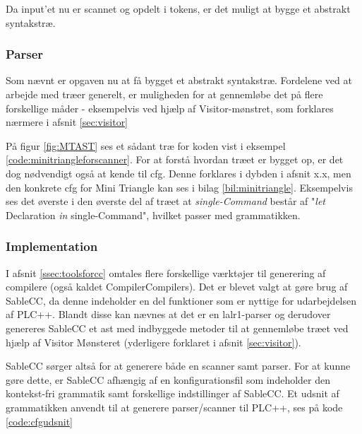 \noindent Da input'et nu er scannet og opdelt i tokens, er det muligt at bygge et abstrakt syntakstræ.

\subsubsection{Parser}
Som nævnt er opgaven nu at få bygget et abstrakt syntakstræ. Fordelene ved at arbejde med træer generelt, er muligheden for at gennemløbe det på flere forskellige måder - eksempelvis ved hjælp af Visitor-mønstret, som forklares nærmere i afsnit \ref{sec:visitor}


\noindent På figur \ref{fig:MTAST} ses et sådant træ for koden vist i eksempel \ref{code:minitriangleforscanner}. For at forstå hvordan træet er bygget op, er det dog nødvendigt også at kende til \gls{cfg}. Denne forklares i dybden i afsnit x.x, men den konkrete \gls{cfg} for Mini Triangle kan ses i bilag \ref{bil:minitriangle}. Eksempelvis ses det øverste i den øverste del af træet at \textit{single-Command} består af "\textit{let} Declaration \textit{in} single-Command"\mbox{}, hvilket passer med grammatikken.


\subsubsection{Implementation}
\wip{}

I afsnit \ref{ssec:toolsforcc} omtales flere forskellige værktøjer til generering af compilere (også kaldet CompilerCompilers). Det er blevet valgt at gøre brug af SableCC, da denne indeholder en del funktioner som er nyttige for udarbejdelsen af PLC++. Blandt disse kan nævnes at det er en \gls{lalr}1-parser og derudover genereres SableCC et \gls{ast} med indbyggede metoder til at gennemløbe træet ved hjælp af Visitor Mønsteret (yderligere forklaret i afsnit \ref{sec:visitor}). 

SableCC sørger altså for at generere både en scanner samt parser. For at kunne gøre dette, er SableCC afhængig af en konfigurationsfil som indeholder den kontekst-fri grammatik samt forskellige indstillinger af SableCC. Et udsnit af grammatikken anvendt til at generere parser/scanner til PLC++, ses på kode \ref{code:cfgudsnit}


